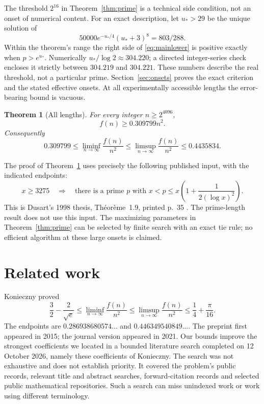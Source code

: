 \documentclass[10pt]{amsart}
\newtheorem{theorem}{Theorem}
\theoremstyle{remark}
\begin{document}
The threshold $2^{16}$ in Theorem~\ref{thm:prime} is a technical side
condition, not an onset of numerical content. For an exact description,
let $u_*>29$ be the unique solution of
\begin{equation}\label{eq:positivity}
 50000e^{-u_*/4}(u_*+3)^8=803/288.
\end{equation}
Within the theorem's range the right side of \eqref{eq:mainlower} is
positive exactly when $p>e^{u_*}$. Numerically
$u_*/\log2\approx304.220$; a directed integer-series check encloses
it strictly between $304.219$ and $304.221$. These numbers describe
the real threshold, not a particular prime. Section~\ref{sec:onsets} proves the exact
criterion and the stated effective onsets. At all experimentally
accessible lengths the error-bearing bound is vacuous.

\begin{theorem}[All lengths]\label{thm:all}
For every integer $n\ge2^{4096}$,
\[
 f(n)\ge0.309799n^2.
\]
Consequently
\[
 0.309799\le\liminf_{n\to\infty}\frac{f(n)}{n^2}
 \le\limsup_{n\to\infty}\frac{f(n)}{n^2}\le0.4435834.
\]
\end{theorem}

The proof of Theorem~\ref{thm:all} uses precisely the following
published input, with the indicated endpoints:
\begin{equation}\tag{P}\label{eq:P}
 x\ge3275\quad\Longrightarrow\quad
 \text{there is a prime }p\text{ with }
 x<p\le x\left(1+\frac1{2(\log x)^2}\right).
\end{equation}
This is Dusart's 1998 thesis, Th\'eor\`eme~1.9, printed p.~35
\cite{Dusart}. The prime-length result does not use this input.
The maximizing parameters in Theorem~\ref{thm:prime} can be selected
by finite search with an exact tie rule; no efficient algorithm at
these large onsets is claimed.

\section{Related work}\label{sec:related}
Konieczny \cite[Theorem~1.2, p.~415]{Konieczny} proved
\[
 \frac32-\frac2{\sqrt e}\le\liminf_{n\to\infty}\frac{f(n)}{n^2}
 \le\limsup_{n\to\infty}\frac{f(n)}{n^2}
 \le\frac14+\frac\pi{16}.
\]
The endpoints are $0.286938680574\ldots$ and $0.446349540849\ldots$.
The preprint first appeared in 2015; the journal version appeared in
2021. Our bounds improve the strongest coefficients we located in a
bounded literature search completed on 12 October 2026, namely these
coefficients of Konieczny. The search was not exhaustive and does not
establish priority. It covered the problem's public records, relevant
title and abstract searches, forward-citation records and selected
public mathematical repositories. Such a search can miss unindexed
work or work using different terminology.
\end{document}
